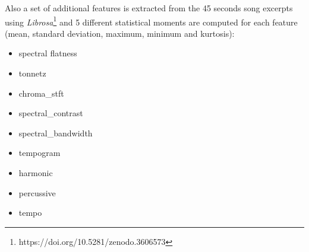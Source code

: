 Also a set of additional features is extracted  from the 45 seconds song excerpts using \emph{Librosa}\footnote{https://doi.org/10.5281/zenodo.3606573} and 5 different statistical moments are computed for each feature (mean, standard deviation, maximum, minimum and kurtosis):

\begin{itemize}
	\item spectral flatness
	\item tonnetz
	\item chroma\_stft
	\item spectral\_contrast
	\item spectral\_bandwidth
	\item tempogram
	\item harmonic
	\item percussive
	\item tempo
\end{itemize}
